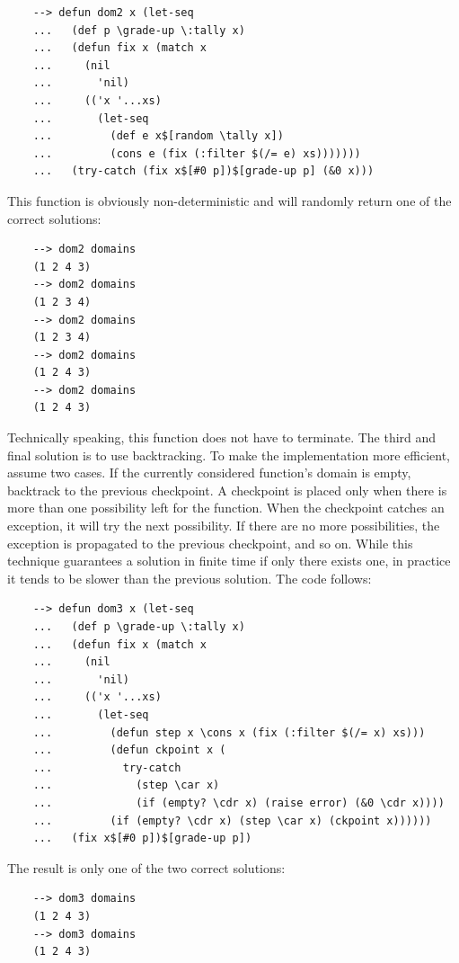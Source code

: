 \begin{Verbatim}
    --> defun dom2 x (let-seq
    ...   (def p \grade-up \:tally x)
    ...   (defun fix x (match x
    ...     (nil
    ...       'nil)
    ...     (('x '...xs)
    ...       (let-seq
    ...         (def e x$[random \tally x])
    ...         (cons e (fix (:filter $(/= e) xs)))))))
    ...   (try-catch (fix x$[#0 p])$[grade-up p] (&0 x)))
\end{Verbatim}

This function is obviously non-deterministic and will randomly return one of the correct solutions:

\begin{Verbatim}
    --> dom2 domains
    (1 2 4 3)
    --> dom2 domains
    (1 2 3 4)
    --> dom2 domains
    (1 2 3 4)
    --> dom2 domains
    (1 2 4 3)
    --> dom2 domains
    (1 2 4 3)
\end{Verbatim}

Technically speaking, this function does not have to terminate. The third and final solution is to use backtracking. To make the implementation more efficient, assume two cases. If the currently considered function's domain is empty, backtrack to the previous checkpoint. A checkpoint is placed only when there is more than one possibility left for the function. When the checkpoint catches an exception, it will try the next possibility. If there are no more possibilities, the exception is propagated to the previous checkpoint, and so on. While this technique guarantees a solution in finite time if only there exists one, in practice it tends to be slower than the previous solution. The code follows:

\begin{Verbatim}
    --> defun dom3 x (let-seq
    ...   (def p \grade-up \:tally x)
    ...   (defun fix x (match x
    ...     (nil
    ...       'nil)
    ...     (('x '...xs)
    ...       (let-seq
    ...         (defun step x \cons x (fix (:filter $(/= x) xs)))
    ...         (defun ckpoint x (
    ...           try-catch
    ...             (step \car x)
    ...             (if (empty? \cdr x) (raise error) (&0 \cdr x))))
    ...         (if (empty? \cdr x) (step \car x) (ckpoint x))))))
    ...   (fix x$[#0 p])$[grade-up p])
\end{Verbatim}

The result is only one of the two correct solutions:

\begin{Verbatim}
    --> dom3 domains
    (1 2 4 3)
    --> dom3 domains
    (1 2 4 3)
\end{Verbatim}


